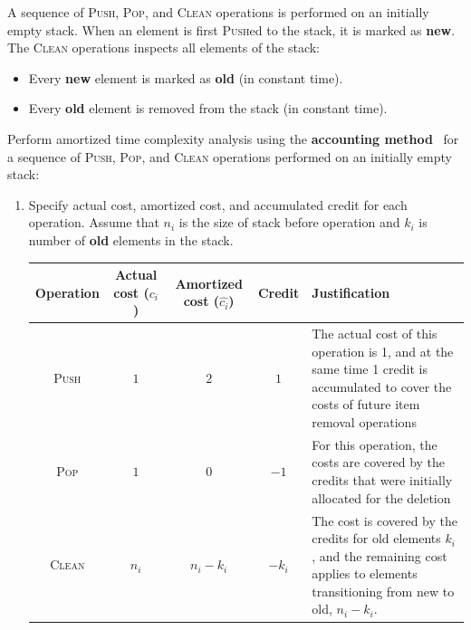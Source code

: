 \documentclass[dvipsnames]{article}
\begin{document}
\begin{enumerate}
{  
  \color{black}

  \item A sequence of \textsc{Push}, \textsc{Pop}, and \textsc{Clean} operations is performed on an initially empty stack.
  When an element is first \textsc{Push}ed to the stack, it is marked as \textbf{new}.
  The \textsc{Clean} operations inspects all elements of the stack:
  \begin{itemize}
    \item Every \textbf{new} element is marked as \textbf{old} (in constant time).
    \item Every \textbf{old} element is removed from the stack (in constant time).
  \end{itemize}
  
  Perform amortized time complexity analysis using the \textbf{accounting method}~\cite[\S 16.2]{Cormen2022}
  for a sequence of \textsc{Push}, \textsc{Pop}, and \textsc{Clean} operations performed on an initially empty stack:
  \begin{enumerate}
    \item Specify actual cost, amortized cost, and accumulated credit for each operation.
    Assume that $n_i$ is the size of stack before operation and $k_i$ is number of \textbf{old} elements in the stack.

  \begin{center}
  \bgroup
  \def\arraystretch{1.5}%
  \begin{tabular}{ |c||c|c|c|p{5cm}| }
   \hline
   Operation & Actual cost ($c_i$) & Amortized cost ($\widehat{c_i}$) & Credit & Justification \\
   \hline
   \hline
   \textsc{Push} & \(1\) & \(2\) & \(1\) & The actual cost of this operation is 1, and at the same time 1 credit is accumulated to cover the costs of future item removal operations\\
   \hline
   \textsc{Pop} & \(1\) & \(0\) & \(-1\) & For this operation, the costs are covered by the credits that were initially allocated for the deletion \\
   \hline
    \textsc{Clean} & \( n_i \) & \( n_i - k_i \) & \( -k_i \) & The cost is covered by the credits for old elements \( k_i \), and the remaining cost applies to elements transitioning from new to old, \( n_i - k_i \). \\
    \hline
  \end{tabular}
  \egroup
  \end{center}
  \normalsize


\end{enumerate}}
\end{enumerate}
\end{document}
